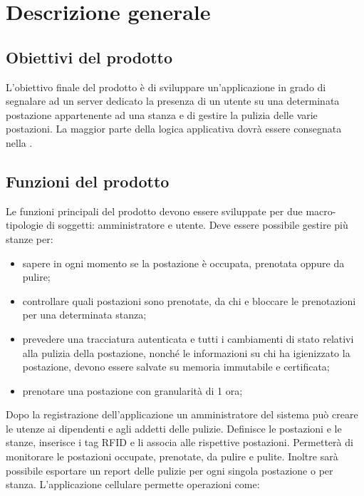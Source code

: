 \section{Descrizione generale}

\subsection{Obiettivi del prodotto}
L'obiettivo finale del prodotto è di sviluppare un’applicazione in grado di segnalare ad un server dedicato la presenza di un utente su una determinata postazione appartenente ad una stanza e di gestire la pulizia delle varie postazioni.
La maggior parte della logica applicativa dovrà essere consegnata nella  .

\subsection{Funzioni del prodotto}
Le funzioni principali del prodotto devono essere sviluppate per due macro-tipologie di soggetti: amministratore e utente.
Deve essere possibile gestire più stanze per:
\begin{itemize}
	\item sapere in ogni momento se la postazione è occupata, prenotata oppure da pulire; \\
	\item controllare quali postazioni sono prenotate, da chi e bloccare le prenotazioni per una determinata stanza; \\
	\item prevedere una tracciatura autenticata e tutti i cambiamenti di stato relativi alla pulizia della postazione, nonché le informazioni su chi ha igienizzato la postazione, devono essere salvate su memoria immutabile e certificata; \\
	\item prenotare una postazione con granularità di 1 ora; \\
\end{itemize}
Dopo la registrazione dell’applicazione un amministratore del sistema può creare le utenze ai dipendenti e agli addetti delle pulizie. Definisce le postazioni e le stanze, inserisce i tag RFID e li associa alle rispettive postazioni.
Permetterà di monitorare le postazioni occupate, prenotate, da pulire e pulite. Inoltre sarà possibile esportare un report delle pulizie per ogni singola postazione o per stanza.
L’applicazione cellulare permette operazioni come:
